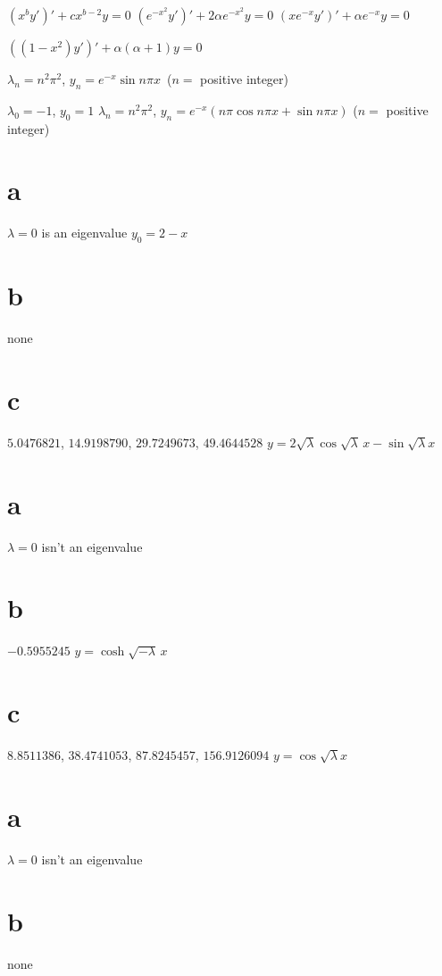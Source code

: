 \smallskip

 $(x^{b}y')'+cx^{b-2}y=0$\;
 $(e^{-x^{2}}y')'+2\alpha e^{-x^{2}}y =0$\;
 $(xe^{-x}y')'+\alpha e^{-x}y=0$

\smallskip
{} $((1-x^{2})y')'+\alpha(\alpha+1)y=0$\;

\smallskip

  $\lambda_{n}=n^{2}\pi^{2}$,\;    $y_{n}=e^{-x}\sin n\pi x$\, ($n=$
positive integer)

\smallskip

 $\lambda_{0}=-1$, $y_{0}=1$   $\lambda_{n}=n^{2}\pi^{2}$,
$y_{n}=e^{-x}(n\pi\cos n\pi x+\sin n\pi x)$  ($n=$ positive integer)

\smallskip

 \part{a} $\lambda=0$ is an eigenvalue   $y_{0}=2-x$\;
\part{b} none\;    \part{c} $5.0476821$, $14.9198790$, $29.7249673$,
$49.4644528$   $y=2\sqrt{\lambda}\cos\sqrt{\lambda}\,x-\sin\sqrt{\lambda} x$

\smallskip

 \part{a} $\lambda=0$ isn't  an eigenvalue\;   \part{b}
 $-0.5955245$   $y=\cosh \sqrt{-\lambda}\,x$\;
\part{c} $8.8511386$,
$38.4741053$,  $87.8245457$, $156.9126094$
$y=\cos\sqrt\lambda x$

\smallskip

 \part{a} $\lambda=0$ isn't  an eigenvalue\;    \part{b} none\;
